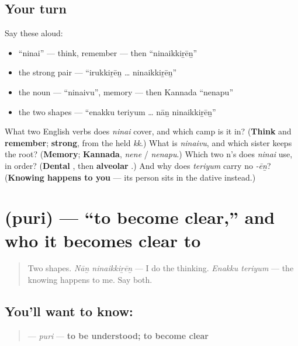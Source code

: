 \subsection*{Your turn}
Say these aloud:

\begin{itemize}
\raggedright
  \item \textquotedblleft{}ninai\textquotedblright{} — think, remember — then \textquotedblleft{}ninaikkiṟēṉ\textquotedblright{}
  \item the strong pair — \textquotedblleft{}irukkiṟēṉ … ninaikkiṟēṉ\textquotedblright{}
  \item the noun — \textquotedblleft{}ninaivu\textquotedblright{}, memory — then Kannada \textquotedblleft{}nenapu\textquotedblright{}
  \item the two shapes — \textquotedblleft{}enakku teriyum … nāṉ ninaikkiṟēṉ\textquotedblright{}
\end{itemize}

\begin{tcolorbox}[breakable,colback=teal!4,colframe=teal!35!black,title={Before you move on}]
What two English verbs does \emph{ninai} cover, and which camp is it in? (\textbf{Think} and \textbf{remember}; \textbf{strong}, from the held \emph{kk}.) What is \emph{ninaivu}, and which sister keeps the root? (\textbf{Memory}; \textbf{Kannada}, \emph{nene} / \emph{nenapu}.) Which two n's does \emph{ninai} use, in order? (\textbf{Dental }, then \textbf{alveolar }.) And why does \emph{teriyum} carry no \emph{-ēṉ}? (\textbf{Knowing happens to you} — its person sits in the dative instead.)
\end{tcolorbox}
\section[\texorpdfstring{\ta{புரி} (puri)}{புரி (puri)}]{ (puri) — \textquotedblleft{}to become clear,\textquotedblright{} and who it becomes clear to}

\label{lesson:TA-C33-puri}



\begin{quote}
Two shapes. \emph{Nāṉ ninaikkiṟēṉ} — I do the thinking. \emph{Enakku teriyum} — the knowing happens to me. Say both.
\end{quote}

\subsection*{You'll want to know: }
\begin{quote}
\textbf{} — \emph{puri} — \textbf{to be understood; to become clear}
\end{quote}

